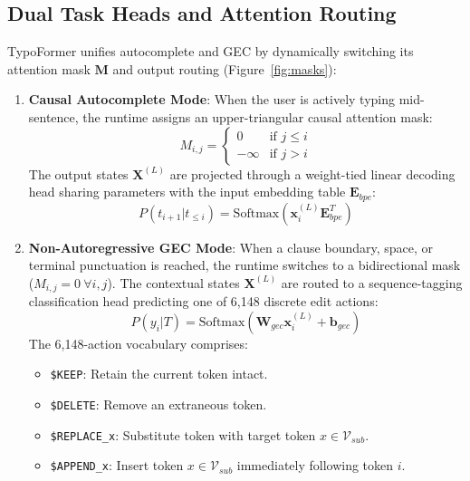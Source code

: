 \documentclass[10pt,journal,compsoc]{IEEEtran}
\begin{document}
\subsection{Dual Task Heads and Attention Routing}
\label{sec:task_heads}
TypoFormer unifies autocomplete and GEC by dynamically switching its attention mask $\mathbf{M}$ and output routing (Figure~\ref{fig:masks}):
\begin{enumerate}
    \item \textbf{Causal Autocomplete Mode}: When the user is actively typing mid-sentence, the runtime assigns an upper-triangular causal attention mask:
    \begin{equation}
    M_{i,j} = \begin{cases} 0 & \text{if } j \le i \\ -\infty & \text{if } j > i \end{cases}
    \end{equation}
    The output states $\mathbf{X}^{(L)}$ are projected through a weight-tied linear decoding head sharing parameters with the input embedding table $\mathbf{E}_{bpe}$:
    \begin{equation}
    P(t_{i+1} | t_{\le i}) = \mathrm{Softmax}(\mathbf{x}_i^{(L)} \mathbf{E}_{bpe}^T)
    \end{equation}
    \item \textbf{Non-Autoregressive GEC Mode}: When a clause boundary, space, or terminal punctuation is reached, the runtime switches to a bidirectional mask ($M_{i,j} = 0 \ \forall i, j$). The contextual states $\mathbf{X}^{(L)}$ are routed to a sequence-tagging classification head predicting one of 6,148 discrete edit actions:
    \begin{equation}
    P(y_i | T) = \mathrm{Softmax}(\mathbf{W}_{gec} \mathbf{x}_i^{(L)} + \mathbf{b}_{gec})
    \end{equation}
    The 6,148-action vocabulary comprises:
    \begin{itemize}
        \item \texttt{\$KEEP}: Retain the current token intact.
        \item \texttt{\$DELETE}: Remove an extraneous token.
        \item \texttt{\$REPLACE\_x}: Substitute token with target token $x \in \mathcal{V}_{sub}$.
        \item \texttt{\$APPEND\_x}: Insert token $x \in \mathcal{V}_{sub}$ immediately following token $i$.
    \end{itemize}
\end{enumerate}
\end{document}
